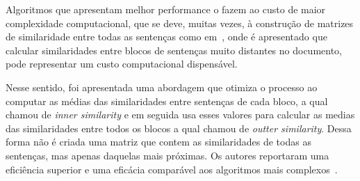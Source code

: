 Algoritmos que apresentam melhor performance o fazem ao custo de maior complexidade computacional, que se deve, muitas vezes, à construção de matrizes de similaridade entre todas as sentenças como em~\cite{Choi2000}, onde é apresentado que calcular similaridades entre blocos de sentenças muito distantes no documento, pode representar um custo computacional dispensável. %

Nesse sentido, foi apresentada uma abordagem que otimiza o processo ao computar as médias das similaridades entre sentenças de cada bloco, a qual chamou de \textit{inner similarity} e em seguida usa esses valores para calcular as medias das similaridades entre todos os blocos a qual chamou de \textit{outter similarity}. Dessa forma não é criada uma matriz que contem as similaridades de todas as sentenças, mas apenas daquelas mais próximas. Os autores reportaram uma eficiência superior e uma eficácia comparável aos algoritmos mais complexos~\cite{Kern2009}.


% 










